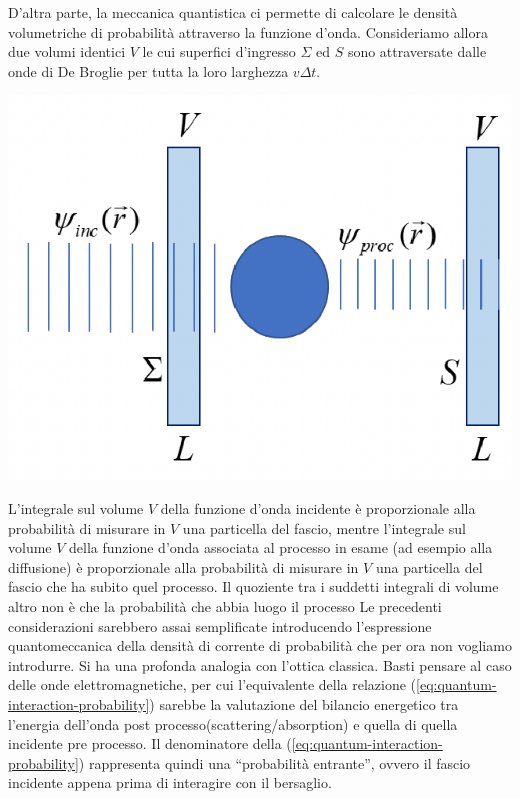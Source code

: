 D’altra parte, la meccanica quantistica ci permette di calcolare le densità
volumetriche di probabilità attraverso la funzione d’onda.
Consideriamo allora due volumi identici $V$ le cui superfici d’ingresso $\Sigma$ ed $S$ sono attraversate dalle onde di De Broglie per tutta la loro larghezza $v \Delta t$.
\begin{marginfigure}
	\centering
	\includegraphics{figs/quantum-process-cross-section}
\end{marginfigure}
L’integrale sul volume $V$ della funzione d’onda incidente è proporzionale alla probabilità di misurare in $V$ una particella del fascio, mentre l’integrale sul volume $V$ della funzione d’onda associata al processo in esame (ad esempio alla diffusione) è proporzionale alla probabilità di misurare in $V$ una particella del fascio che ha subito quel processo.
Il quoziente tra i suddetti integrali di volume altro non è che la probabilità che abbia luogo il processo\sidenote
{
	Le precedenti considerazioni sarebbero assai semplificate introducendo l’espressione quantomeccanica della
	densità di corrente di probabilità che per ora non vogliamo introdurre.
}\sidenote
{
	Si ha una profonda analogia con l'ottica classica. Basti pensare al caso delle onde elettromagnetiche, per cui l'equivalente
della relazione (\ref{eq:quantum-interaction-probability}) sarebbe la valutazione del bilancio energetico
tra l'energia dell'onda post processo(scattering/absorption) e quella di quella incidente pre processo.
Il denominatore della (\ref{eq:quantum-interaction-probability}) rappresenta quindi una ``probabilità entrante'',
	ovvero il fascio incidente appena prima di interagire con il bersaglio.
}
